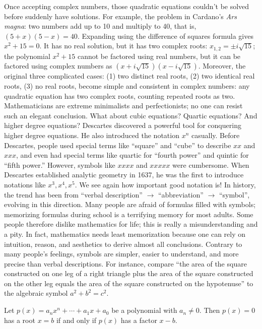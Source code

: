 \documentclass[b5paper]{article}
\begin{document}
Once accepting complex numbers, those quadratic equations couldn't be solved before suddenly have solutions. For example, the problem in Cardano's \emph{Ars magna}: two numbers add up to 10 and multiply to 40, that is, $(5 + x)(5 - x) = 40$. Expanding using the difference of squares formula gives $x^2 + 15 = 0$. It has no real solution, but it has two complex roots: $x_{1,2} = \pm i\sqrt{15}$; the polynomial $x^2 + 15$ cannot be factored using real numbers, but it can be factored using complex numbers as $(x + i\sqrt{15})(x - i\sqrt{15})$. Moreover, the original three complicated cases: (1) two distinct real roots, (2) two identical real roots, (3) no real roots, become simple and consistent in complex numbers: any quadratic equation has two complex roots, counting repeated roots as two. Mathematicians are extreme minimalists and perfectionists; no one can resist such an elegant conclusion. What about cubic equations? Quartic equations? And higher degree equations? Descartes discovered a powerful tool for conquering higher degree equations. He also introduced the notation $x^n$ casually. Before Descartes, people used special terms like \enquote{square} and \enquote{cube} to describe $xx$ and $xxx$, and even had special terms like quartic for \enquote{fourth power} and quintic for \enquote{fifth power.} However, symbols like $xxxx$ and $xxxxx$ were cumbersome. When Descartes established analytic geometry in 1637, he was the first to introduce notations like $x^3, x^4, x^5$. We see again how important good notation is! In history, the trend has been from \enquote{verbal description} $\to$ \enquote{abbreviation} $\to$ \enquote{symbol}, evolving in this direction. Many people are afraid of formulas filled with symbols; memorizing formulas during school is a terrifying memory for most adults. Some people therefore dislike mathematics for life; this is really a misunderstanding and a pity. In fact, mathematics needs least memorization because one can rely on intuition, reason, and aesthetics to derive almost all conclusions. Contrary to many people's feelings, symbols are simpler, easier to understand, and more precise than verbal descriptions. For instance, compare \enquote{the area of the square constructed on one leg of a right triangle plus the area of the square constructed on the other leg equals the area of the square constructed on the hypotenuse} to the algebraic symbol $a^2 + b^2 = c^2$.

\begin{theorem}[Descartes]
Let $p(x) = a_nx^n + \dotsb + a_1x + a_0$ be a polynomial with $a_n \ne 0$. Then $p(x) = 0$ has a root $x = b$ if and only if $p(x)$ has a factor $x - b$.
\end{theorem}
\end{document}
